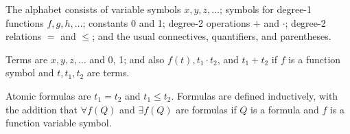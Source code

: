 The alphabet consists of variable symbols $x, y, z, \ldots$; symbols for degree-1 functions $f, g, h, \ldots$; constants 0 and 1; degree-2 operations $+$ and $\cdot$; degree-2 relations $=$ and $\leqslant$; and the usual connectives, quantifiers, and parentheses.

Terms are $x, y, z, \ldots$ and 0, 1; and also $f(t), t_1 \cdot t_2$, and $t_1 + t_2$ if $f$ is a function symbol and $t, t_1, t_2$ are terms.

Atomic formulas are $t_1 = t_2$ and $t_1 \leqslant t_2$. Formulas are defined inductively, with the addition that $\forall f(Q)$ and $\exists f(Q)$ are formulas if $Q$ is a formula and $f$ is a function variable symbol.